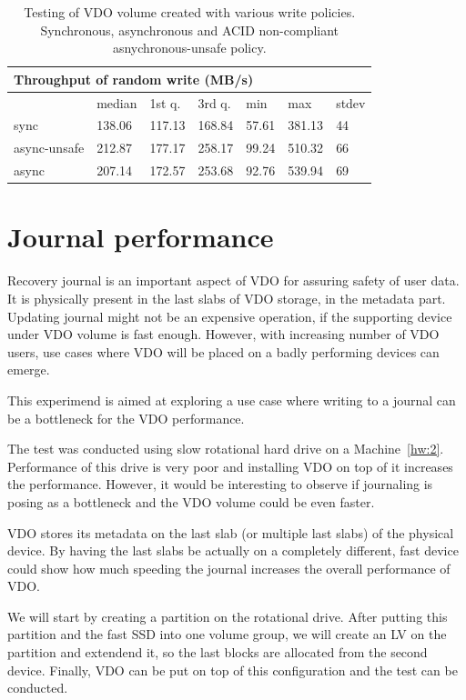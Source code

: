 \documentclass[
  color, %
  table, %
  lof,   %
  lot,   %
]{fithesis3}
\begin{document}
\begin{table}
\begin{tabular}{|l|l|l|l|l|l|l|}
        \hline
        \multicolumn{7}{|l|}{Throughput of random write (MB/s)} \\ \hline
         & median & 1st q. & 3rd q. & min & max & stdev \\ \hline 
sync & 138.06 & 117.13 & 168.84 & 57.61 & 381.13 & 44 \\ \hline
async-unsafe & 212.87 & 177.17 & 258.17 & 99.24 & 510.32 & 66 \\ \hline
async & 207.14 & 172.57 & 253.68 & 92.76 & 539.94 & 69 \\ \hline
\end{tabular}
\caption[Performance of various write policies]{Testing of VDO volume created with various write policies. Synchronous, asynchronous and ACID non-compliant asnychronous-unsafe policy.}
\label{tab:writepolicies}
\end{table}

\section{Journal performance}
Recovery journal is an important aspect of VDO for assuring safety of user data. It is physically present in the last slabs of VDO storage, in the metadata part. Updating journal might not be an expensive operation, if the supporting device under VDO volume is fast enough. However, with increasing number of VDO users, use cases where VDO will be placed on a badly performing devices can emerge.

This experimend is aimed at exploring a use case where writing to a journal can be a bottleneck for the VDO performance.

The test was conducted using slow rotational hard drive on a Machine~\ref{hw:2}. Performance of this drive is very poor and installing VDO on top of it increases the performance. However, it would be interesting to observe if journaling is posing as a bottleneck and the VDO volume could be even faster.

VDO stores its metadata on the last slab (or multiple last slabs) of the physical device. By having the last slabs be actually on a completely different, fast device could show how much speeding the journal increases the overall performance of VDO.

We will start by creating a partition on the rotational drive. After putting this partition and the fast SSD into one volume group, we will create an LV on the partition and extendend it, so the last blocks are allocated from the second device. Finally, VDO can be put on top of this configuration and the test can be conducted.
\end{document}
